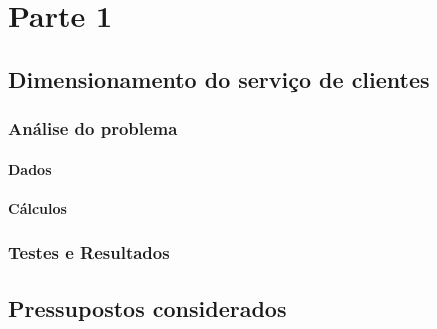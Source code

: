 \chapter{Parte 1}
\label{cap:p1}




\section{Dimensionamento do serviço de clientes}

\subsection{Análise do problema}
\subsubsection{Dados}
\subsubsection{Cálculos}





\newpage
\subsection{Testes e Resultados}


\section{Pressupostos considerados}




